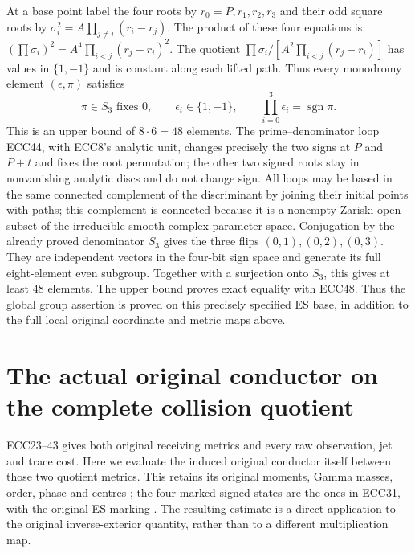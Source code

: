 \documentclass[11pt]{article}
\begin{document}
At a base point label the four roots by $r_0=P,r_1,r_2,r_3$ and their
odd square roots by $\sigma_i^2=A\prod_{j\ne i}(r_i-r_j)$. The product
of these four equations is
$(\prod\sigma_i)^2=A^4\prod_{i<j}(r_j-r_i)^2$. The quotient
$\prod\sigma_i/[A^2\prod_{i<j}(r_j-r_i)]$ has values in $\{1,-1\}$
and is constant along each lifted path. Thus every monodromy element
$(\epsilon,\pi)$ satisfies
\begin{equation}
 \pi\in S_3\text{ fixes }0,\qquad
 \epsilon_i\in\{1,-1\},\qquad
 \prod_{i=0}^3\epsilon_i=\operatorname{sgn}\pi.
 \tag{ECC48}
\end{equation}
This is an upper bound of $8\cdot6=48$ elements. The prime--denominator
loop ECC44, with ECC8's analytic unit, changes precisely the two signs
at $P$ and $P+t$ and fixes the root permutation; the other two signed
roots stay in nonvanishing analytic discs and do not change sign.
All loops may be based in the same connected complement of the
discriminant by joining their initial points with paths; this complement
is connected because it is a nonempty Zariski-open subset of the
irreducible smooth complex parameter space. Conjugation by the already
proved denominator $S_3$ gives the three flips $(0,1),(0,2),(0,3)$.
They are independent vectors in the four-bit sign space and generate
its full eight-element even subgroup. Together with a surjection onto
$S_3$, this gives at least $48$ elements. The upper bound proves exact
equality with ECC48. Thus the global group assertion is proved on this
precisely specified ES base, in addition to the full local original
coordinate and metric maps above.


\section{The actual original conductor on the complete collision quotient}
ECC23--43 gives both original receiving metrics and every raw observation,
jet and trace cost. Here we evaluate the induced original conductor itself
between those two quotient metrics. This retains its original moments,
Gamma masses, order, phase and centres \cite{WCF}; the four marked signed
states are the ones in ECC31, with the original ES marking \cite{ES488}.
The resulting estimate is a direct application to the original
inverse-exterior quantity, rather than to a different multiplication map.
\end{document}
